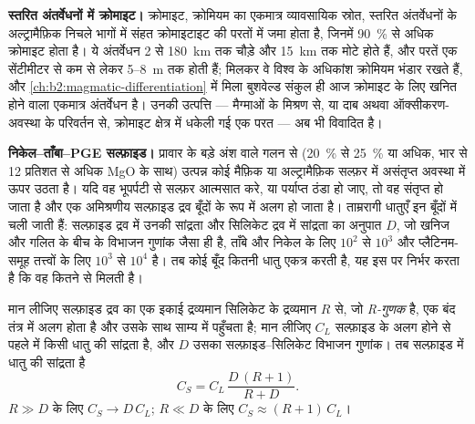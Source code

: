 \textbf{स्तरित अंतर्वेधनों में क्रोमाइट।} क्रोमाइट, क्रोमियम का एकमात्र व्यावसायिक स्रोत, स्तरित
अंतर्वेधनों के अल्ट्रामैफ़िक निचले भागों में संहत क्रोमाइटाइट की परतों में जमा होता है, जिनमें
\qty{90}{\percent} से अधिक क्रोमाइट होता है। ये अंतर्वेधन 2 से \qty{180}{km} तक चौड़े और
\qty{15}{km} तक मोटे होते हैं, और परतें एक सेंटीमीटर से कम से लेकर 5--\qty{8}{m} तक होती हैं; मिलकर वे
विश्व के अधिकांश क्रोमियम भंडार रखते हैं, और \cref{ch:b2:magmatic-differentiation} में मिला
बुशवेल्ड संकुल ही आज क्रोमाइट के लिए खनित होने वाला एकमात्र अंतर्वेधन है। उनकी उत्पत्ति --- मैग्माओं के
मिश्रण से, या दाब अथवा ऑक्सीकरण-अवस्था के परिवर्तन से, क्रोमाइट क्षेत्र में धकेली गई एक  परत ---
अब भी विवादित है।

\textbf{निकेल--ताँबा--PGE सल्फ़ाइड।} प्रावार के बड़े अंश वाले गलन से (\qty{20}{\percent} से \qty{25}{\percent}
या अधिक, भार से 12 प्रतिशत से अधिक MgO के साथ) उत्पन्न कोई मैफ़िक या अल्ट्रामैफ़िक 
सल्फ़र में असंतृप्त अवस्था में ऊपर उठता है। यदि वह भूपर्पटी से सल्फ़र आत्मसात करे, या पर्याप्त ठंडा हो जाए, तो वह
संतृप्त हो जाता है और एक अमिश्रणीय सल्फ़ाइड द्रव बूँदों के रूप में अलग हो जाता है। ताम्ररागी धातुएँ इन
बूँदों में चली जाती हैं: सल्फ़ाइड द्रव में उनकी सांद्रता और सिलिकेट द्रव में सांद्रता का अनुपात $D$, जो
खनिज और गलित के बीच के विभाजन गुणांक जैसा ही है, ताँबे और निकेल के लिए $10^2$ से $10^3$ और
प्लैटिनम-समूह तत्त्वों के लिए $10^3$ से $10^4$ है। तब कोई बूँद कितनी धातु एकत्र करती है, यह इस पर
निर्भर करता है कि वह कितने  से मिलती है।

\begin{proposition}[R-गुणक]\label{prop:b2:ore-deposits:r-factor}
मान लीजिए सल्फ़ाइड द्रव का एक इकाई द्रव्यमान सिलिकेट  के द्रव्यमान $R$ से, जो \emph{R-गुणक}
है, एक बंद तंत्र में अलग होता है और उसके साथ साम्य में पहुँचता है; मान लीजिए $C_L$ सल्फ़ाइड के अलग होने से
पहले  में किसी धातु की सांद्रता है, और $D$ उसका सल्फ़ाइड--सिलिकेट विभाजन
गुणांक। तब सल्फ़ाइड में धातु की सांद्रता है
\begin{equation}
C_S = C_L\,\frac{D\,(R + 1)}{R + D} .
\label{eq:b2:ore-deposits:r-factor}
\end{equation}
$R \gg D$ के लिए $C_S \to D\,C_L$; $R \ll D$ के लिए $C_S \approx (R + 1)\,C_L$।
\end{proposition}

